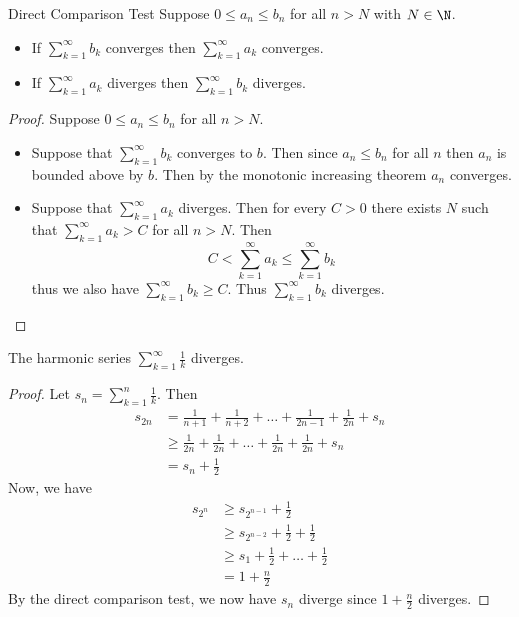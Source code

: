 \begin{thm}{Direct Comparison Test}{} Suppose $0\leq a_n\leq b_n$ for all $n>N$ with $N\in\N$.
\begin{itemize}
\item If $\sum_{k=1}^\infty b_k$ converges then $\sum_{k=1}^\infty a_k$ converges. 
\item If $\sum_{k=1}^\infty a_k$ diverges then $\sum_{k=1}^\infty b_k$ diverges. 
\end{itemize}\tcbline
\begin{proof} Suppose $0\leq a_n\leq b_n$ for all $n>N$. 
\begin{itemize}
\item Suppose that $\sum_{k=1}^\infty b_k$ converges to $b$. Then since $a_n\leq b_n$ for all $n$ then $a_n$ is bounded above by $b$. Then by the monotonic increasing theorem $a_n$ converges. 
\item Suppose that $\sum_{k=1}^\infty a_k$ diverges. Then for every $C>0$ there exists $N$ such that $\sum_{k=1}^\infty a_k>C$ for all $n>N$. Then $$C<\sum_{k=1}^\infty a_k\leq\sum_{k=1}^\infty b_k$$ thus we also have $\sum_{k=1}^\infty b_k\geq C$. Thus $\sum_{k=1}^\infty b_k$ diverges. 
\end{itemize}
\end{proof}
\end{thm}

\begin{lmm}{}{} The harmonic series $\sum_{k=1}^\infty\frac{1}{k}$ diverges. \tcbline
\begin{proof} Let $s_n=\sum_{k=1}^{n}\frac{1}{k}$. Then
\begin{align*}
s_{2n}&=\frac{1}{n+1}+\frac{1}{n+2}+\dots+\frac{1}{2n-1}+\frac{1}{2n}+s_n\\
&\geq\frac{1}{2n}+\frac{1}{2n}+\dots+\frac{1}{2n}+\frac{1}{2n}+s_n\\
&=s_n+\frac{1}{2}
\end{align*}
Now, we have 
\begin{align*}
s_{2^n}&\geq s_{2^{n-1}}+\frac{1}{2}\\
&\geq s_{2^{n-2}}+\frac{1}{2}+\frac{1}{2}\\
&\geq s_1+\frac{1}{2}+\dots+\frac{1}{2}\tag{$n$ times}\\
&=1+\frac{n}{2}
\end{align*}
By the direct comparison test, we now have $s_n$ diverge since $1+\frac{n}{2}$ diverges. 
\end{proof}
\end{lmm}

